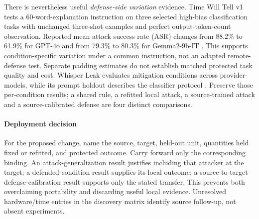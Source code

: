 There is nevertheless useful \emph{defense-side variation} evidence. Time Will Tell v1 tests a 60-word-explanation instruction on three selected high-bias classification tasks with unchanged three-shot examples and perfect output-token-count observation. Reported mean attack success rate (ASR) changes from 88.2\% to 61.9\% for GPT-4o and from 79.3\% to 80.3\% for Gemma2-9b-IT \cite[VII-B]{timewilltell2024}. This supports condition-specific variation under a common instruction, not an adapted remote-defense test. Separate padding estimates do not establish matched protected task quality and cost. Whisper Leak evaluates mitigation conditions across provider-models, while its prompt holdout describes the classifier protocol \cite[3.2,6]{whisperleak2025}. Preserve those per-condition results; a shared rule, a refitted local attack, a source-trained attack and a source-calibrated defense are four distinct comparisons.

\paragraph{Deployment decision}
For the proposed change, name the source, target, held-out unit, quantities held fixed or refitted, and protected outcome. Carry forward only the corresponding binding. An attack-generalization result justifies including that attacker at the target; a defended-condition result supplies its local outcome; a source-to-target defense-calibration result supports only the stated transfer. This prevents both overclaiming portability and discarding useful local evidence. Unresolved hardware/time entries in the discovery matrix identify source follow-up, not absent experiments.
